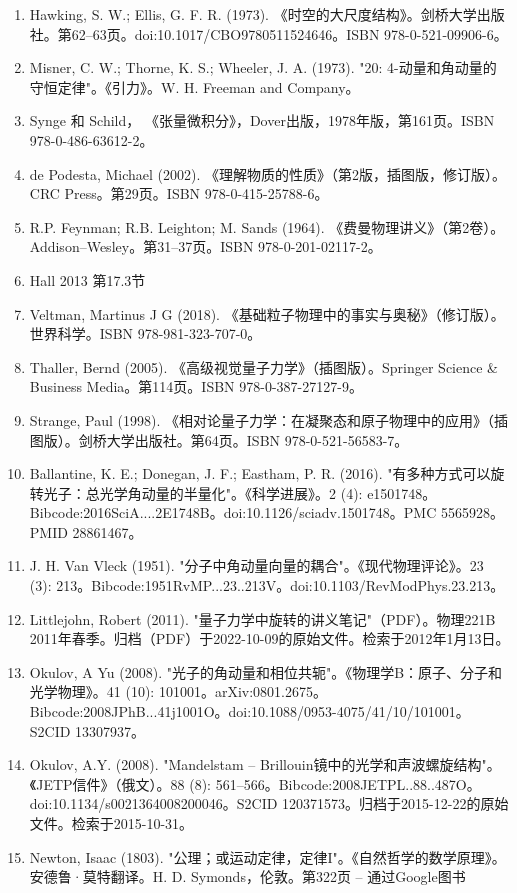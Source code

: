 \begin{enumerate}
\item Hawking, S. W.; Ellis, G. F. R. (1973). 《时空的大尺度结构》。剑桥大学出版社。第62–63页。doi:10.1017/CBO9780511524646。ISBN 978-0-521-09906-6。
\item Misner, C. W.; Thorne, K. S.; Wheeler, J. A. (1973). "20: 4-动量和角动量的守恒定律"。《引力》。W. H. Freeman and Company。
\item Synge 和 Schild， 《张量微积分》，Dover出版，1978年版，第161页。ISBN 978-0-486-63612-2。
\item de Podesta, Michael (2002). 《理解物质的性质》（第2版，插图版，修订版）。CRC Press。第29页。ISBN 978-0-415-25788-6。
\item R.P. Feynman; R.B. Leighton; M. Sands (1964). 《费曼物理讲义》（第2卷）。Addison–Wesley。第31–37页。ISBN 978-0-201-02117-2。
\item Hall 2013 第17.3节
\item Veltman, Martinus J G (2018). 《基础粒子物理中的事实与奥秘》（修订版）。世界科学。ISBN 978-981-323-707-0。
\item Thaller, Bernd (2005). 《高级视觉量子力学》（插图版）。Springer Science & Business Media。第114页。ISBN 978-0-387-27127-9。
\item Strange, Paul (1998). 《相对论量子力学：在凝聚态和原子物理中的应用》（插图版）。剑桥大学出版社。第64页。ISBN 978-0-521-56583-7。
\item Ballantine, K. E.; Donegan, J. F.; Eastham, P. R. (2016). "有多种方式可以旋转光子：总光学角动量的半量化"。《科学进展》。2 (4): e1501748。Bibcode:2016SciA....2E1748B。doi:10.1126/sciadv.1501748。PMC 5565928。PMID 28861467。
\item J. H. Van Vleck (1951). "分子中角动量向量的耦合"。《现代物理评论》。23 (3): 213。Bibcode:1951RvMP...23..213V。doi:10.1103/RevModPhys.23.213。
\item Littlejohn, Robert (2011). "量子力学中旋转的讲义笔记"（PDF）。物理221B 2011年春季。归档（PDF）于2022-10-09的原始文件。检索于2012年1月13日。
\item Okulov, A Yu (2008). "光子的角动量和相位共轭"。《物理学B：原子、分子和光学物理》。41 (10): 101001。arXiv:0801.2675。Bibcode:2008JPhB...41j1001O。doi:10.1088/0953-4075/41/10/101001。S2CID 13307937。
\item Okulov, A.Y. (2008). "Mandelstam – Brillouin镜中的光学和声波螺旋结构"。《JETP信件》（俄文）。88 (8): 561–566。Bibcode:2008JETPL..88..487O。doi:10.1134/s0021364008200046。S2CID 120371573。归档于2015-12-22的原始文件。检索于2015-10-31。
\item Newton, Isaac (1803). "公理；或运动定律，定律I"。《自然哲学的数学原理》。安德鲁·莫特翻译。H. D. Symonds，伦敦。第322页 – 通过Google图书

\end{enumerate}
